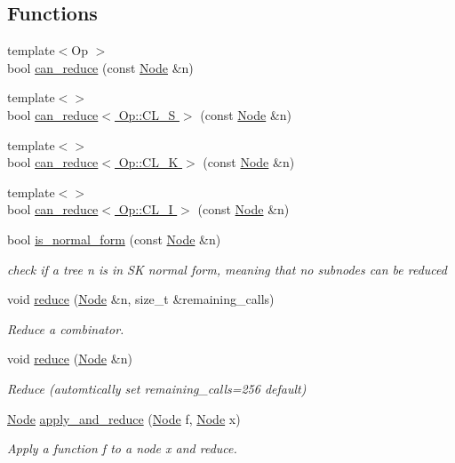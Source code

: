 \subsection*{Functions}
\begin{DoxyCompactItemize}
\item 
{\footnotesize template$<$Op $>$ }\\bool \hyperlink{namespace_combinators_aa3c93f1edab6764d54dda56aafac9cd3}{can\+\_\+reduce} (const \hyperlink{class_node}{Node} \&n)
\item 
{\footnotesize template$<$$>$ }\\bool \hyperlink{namespace_combinators_aa038cd10e92daa6feb9f9010f705fb33}{can\+\_\+reduce$<$ Op\+::\+C\+L\+\_\+\+S $>$} (const \hyperlink{class_node}{Node} \&n)
\item 
{\footnotesize template$<$$>$ }\\bool \hyperlink{namespace_combinators_a5c0e720989a7b4ad841c071c48924b78}{can\+\_\+reduce$<$ Op\+::\+C\+L\+\_\+\+K $>$} (const \hyperlink{class_node}{Node} \&n)
\item 
{\footnotesize template$<$$>$ }\\bool \hyperlink{namespace_combinators_a5fe26e0973d49aa2b6cedd39529705bf}{can\+\_\+reduce$<$ Op\+::\+C\+L\+\_\+\+I $>$} (const \hyperlink{class_node}{Node} \&n)
\item 
bool \hyperlink{namespace_combinators_a29877c1bfde5b9807fd7a7538efe9e0c}{is\+\_\+normal\+\_\+form} (const \hyperlink{class_node}{Node} \&n)
\begin{DoxyCompactList}\small\item\em check if a tree n is in SK normal form, meaning that no subnodes can be reduced \end{DoxyCompactList}\item 
void \hyperlink{namespace_combinators_a6abc966e0ab0f2aa8170712f32541458}{reduce} (\hyperlink{class_node}{Node} \&n, size\+\_\+t \&remaining\+\_\+calls)
\begin{DoxyCompactList}\small\item\em Reduce a combinator. \end{DoxyCompactList}\item 
void \hyperlink{namespace_combinators_a10b79cf8cc79cd5505e8d3c70470aab7}{reduce} (\hyperlink{class_node}{Node} \&n)
\begin{DoxyCompactList}\small\item\em Reduce (automtically set remaining\+\_\+calls=256 default) \end{DoxyCompactList}\item 
\hyperlink{class_node}{Node} \hyperlink{namespace_combinators_a30e2a8ed9eb766eb35ce3feb10cbd59a}{apply\+\_\+and\+\_\+reduce} (\hyperlink{class_node}{Node} f, \hyperlink{class_node}{Node} x)
\begin{DoxyCompactList}\small\item\em Apply a function f to a node x and reduce. \end{DoxyCompactList}\end{DoxyCompactItemize}
